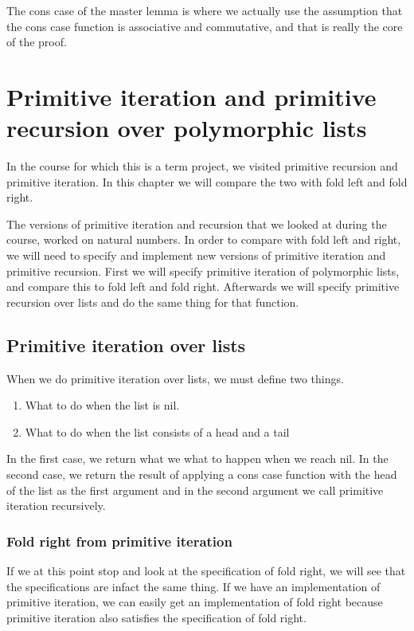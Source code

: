 \documentclass[a4paper]{article}
\begin{document}
The cons case of the master lemma is where we actually use the assumption that
the cons case function is associative and commutative, and that is really the
core of the proof.

\section{Primitive iteration and primitive recursion over polymorphic lists}
In the course for which this is a term project, we visited primitive recursion
and primitive iteration. In this chapter we will compare the two with fold left
and fold right.

The versions of primitive iteration and recursion that we looked at during the
course, worked on natural numbers. In order to compare with fold left and right,
we will need to specify and implement new versions of primitive iteration and
primitive recursion. First we will specify primitive iteration of polymorphic
lists, and compare this to fold left and fold right. Afterwards we will specify
primitive recursion over lists and do the same thing for that function.

\subsection{Primitive iteration over lists}
When we do primitive iteration over lists, we must define two things.
\begin{enumerate}
  \item What to do when the list is nil.
  \item What to do when the list consists of a head and a tail
\end{enumerate}

In the first case, we return what we what to happen when we reach nil.
In the second case, we return the result of applying a cons case function with
the head of the list as the first argument and in the second argument we
call primitive iteration recursively.

\subsubsection{Fold right from primitive iteration}
If we at this point stop and look at the specification of fold right, we will
see that the specifications are infact the same thing. If we have an implementation
of primitive iteration, we can easily get an implementation of fold right because
primitive iteration also satisfies the specification of fold right.
\end{document}
